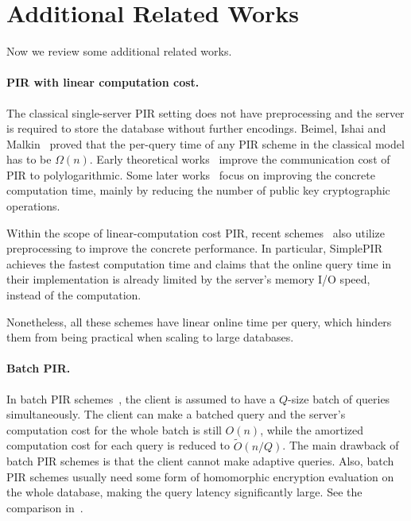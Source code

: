 


\section{Additional Related Works}

Now we review some additional related works.


\paragraph{PIR with linear computation cost.}
The classical single-server PIR setting does not have preprocessing and the server is required to store the database without further encodings.
Beimel, Ishai and Malkin~\cite{bim-pir} proved that the per-query time of any PIR scheme in the classical model has to be $\Omega(n)$. 
Early theoretical works~\cite{pir05,pir02,pir06} improve the communication cost of PIR to polylogarithmic. 
Some later works~\cite{xpir,fastpir,spiral} focus on improving the concrete computation time, mainly by reducing the number of public key cryptographic operations. 

Within the scope of linear-computation cost PIR, recent schemes~\cite{psir,onionpir,frodopir,simplepir} also utilize preprocessing to improve the concrete performance.
In particular, SimplePIR~\cite{simplepir} achieves the fastest computation time and claims that the online query time in their implementation is already limited by the server's memory I/O speed, instead of the computation.

Nonetheless, all these schemes have linear online time per query, which hinders them from being practical when scaling to large databases. 

\paragraph{Batch PIR.} 
In batch PIR schemes~\cite{batchcode,batch-pir-osdi16,angel-pir,vector-pir,pirana}, the client is assumed to have a $Q$-size batch of queries simultaneously. 
The client can make a batched query and the server's computation cost for the whole batch is still $O(n)$, while the amortized computation cost for each query is reduced to $\widetilde{O}(n/Q)$. 
The main drawback of batch PIR schemes is that the client cannot make adaptive queries. 
Also, batch PIR schemes usually need some form of homomorphic encryption evaluation on the whole database, making the query latency significantly large.
See the comparison in~\cite{simplepir}.

